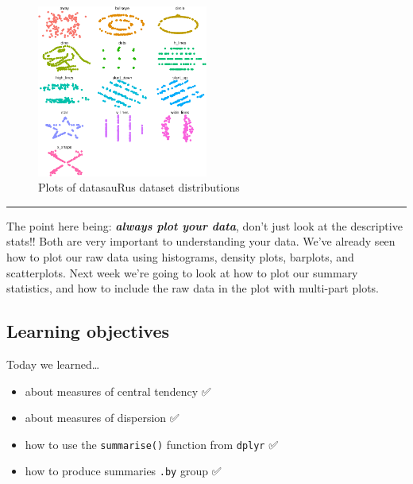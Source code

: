 \documentclass[
  letterpaper,
  DIV=11,
  numbers=noendperiod]{scrartcl}
\providecommand{\tightlist}{%
  \setlength{\itemsep}{0pt}\setlength{\parskip}{0pt}}\usepackage{longtable,booktabs,array}
\begin{document}
\begin{figure}

{\centering \includegraphics[width=0.5\textwidth,height=\textheight]{08-desc_stats_en_files/figure-pdf/fig-datasauRus-1.pdf}

}

\caption{\label{fig-datasauRus}Plots of datasauRus dataset
distributions}

\end{figure}

\begin{center}\rule{0.5\linewidth}{0.5pt}\end{center}

The point here being: \textbf{\emph{always plot your data}}, don't just
look at the descriptive stats!! Both are very important to understanding
your data. We've already seen how to plot our raw data using histograms,
density plots, barplots, and scatterplots. Next week we're going to look
at how to plot our summary statistics, and how to include the raw data
in the plot with multi-part plots.

\hypertarget{learning-objectives}{%
\subsection*{Learning objectives 🏁}\label{learning-objectives}}

Today we learned\ldots{}

\begin{itemize}
\tightlist
\item
  about measures of central tendency ✅
\item
  about measures of dispersion ✅
\item
  how to use the \texttt{summarise()} function from \texttt{dplyr} ✅
\item
  how to produce summaries \texttt{.by} group ✅
\end{itemize}
\end{document}
